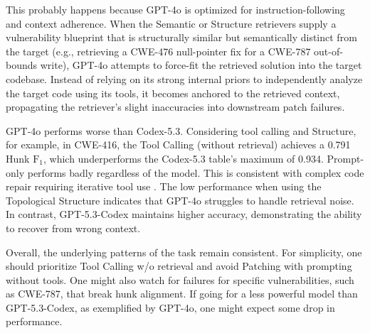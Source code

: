This probably happens because GPT-4o is optimized for instruction-following and context adherence. 
When the Semantic or Structure retrievers supply a vulnerability blueprint that is structurally similar but semantically distinct from the target (e.g., retrieving a CWE-476 null-pointer fix for a CWE-787 out-of-bounds write), GPT-4o attempts to force-fit the retrieved solution into the target codebase. 
Instead of relying on its strong internal priors to independently analyze the target code using its tools, it becomes anchored to the retrieved context, propagating the retriever's slight inaccuracies into downstream patch failures. 

GPT-4o performs worse than Codex-5.3. Considering tool calling and Structure, for example, in CWE-416, the Tool Calling (without retrieval) achieves a 0.791 Hunk $\text{F}_1$, which underperforms the Codex-5.3 table's maximum of 0.934. 
Prompt-only performs badly regardless of the model. 
This is consistent with complex code repair requiring iterative tool use \cite{jimenez2024swebenchlanguagemodelsresolve, bouzenia2025repairagent}.
The low performance when using the Topological Structure indicates that GPT-4o struggles to handle retrieval noise. 
In contrast, GPT-5.3-Codex maintains higher accuracy, demonstrating the ability to recover from wrong context.

Overall, the underlying patterns of the task remain consistent. For simplicity, one should prioritize Tool Calling w/o retrieval and avoid Patching with prompting without tools. One might also watch for failures for specific vulnerabilities, such as CWE-787, that break hunk alignment. If going for a less powerful model than GPT-5.3-Codex, as exemplified by GPT-4o, one might expect some drop in performance.





